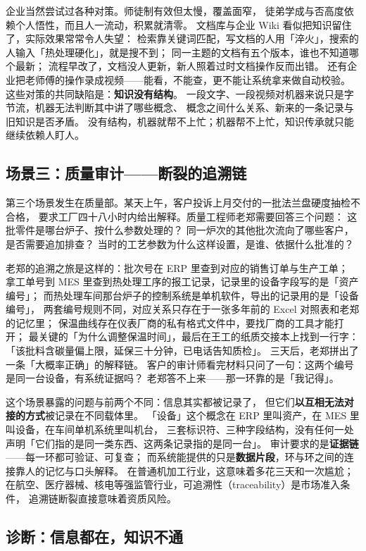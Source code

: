 企业当然尝试过各种对策。师徒制有效但太慢，覆盖面窄，
徒弟学成与否高度依赖个人悟性，而且人一流动，积累就清零。
文档库与企业 Wiki 看似把知识留住了，实际效果常常令人失望：
检索靠关键词匹配，写文档的人用「淬火」，搜索的人输入「热处理硬化」，就是搜不到；
同一主题的文档有五个版本，谁也不知道哪个最新；
流程早改了，文档没人更新，新人照着过时文档操作反而出错。
还有企业把老师傅的操作录成视频——能看，不能查，更不能让系统拿来做自动校验。
这些对策的共同缺陷是：\textbf{知识没有结构}。
一段文字、一段视频对机器来说只是字节流，机器无法判断其中讲了哪些概念、
概念之间什么关系、新来的一条记录与旧知识是否矛盾。
没有结构，机器就帮不上忙；机器帮不上忙，知识传承就只能继续依赖人盯人。

\subsection{场景三：质量审计——断裂的追溯链}

第三个场景发生在质量部。某天上午，客户投诉上月交付的一批法兰盘硬度抽检不合格，
要求工厂四十八小时内给出解释。质量工程师老郑需要回答三个问题：
这批零件是哪台炉子、按什么参数处理的？
同一炉次的其他批次流向了哪些客户，是否需要追加排查？
当时的工艺参数为什么这样设置，是谁、依据什么批准的？

老郑的追溯之旅是这样的：批次号在 ERP 里查到对应的销售订单与生产工单；
拿工单号到 MES 里查到热处理工序的报工记录，记录里的设备字段写的是「资产编号」；
而热处理车间那台炉子的控制系统是单机软件，导出的记录用的是「设备编号」，
两套编号规则不同，对应关系只存在于一张多年前的 Excel 对照表和老郑的记忆里；
保温曲线存在仪表厂商的私有格式文件中，要找厂商的工具才能打开；
最关键的「为什么调整保温时间」，最后在王工的纸质交接本上找到一行字：
「该批料含碳量偏上限，延保三十分钟，已电话告知质检」。
三天后，老郑拼出了一条「大概率正确」的解释链。
客户的审计师看完材料只问了一句：这两个编号是同一台设备，有系统证据吗？
老郑答不上来——那一环靠的是「我记得」。

这个场景暴露的问题与前两个不同：信息其实都被记录了，
但它们\textbf{以互相无法对接的方式}被记录在不同载体里。
「设备」这个概念在 ERP 里叫资产，在 MES 里叫设备，在车间单机系统里叫机台，
三套标识符、三种字段结构，没有任何一处声明「它们指的是同一类东西、这两条记录指的是同一台」。
审计要求的是\textbf{证据链}——每一环都可验证、可复查；
而系统能提供的只是\textbf{数据片段}，环与环之间的连接靠人的记忆与口头解释。
在普通机加工行业，这意味着多花三天和一次尴尬；
在航空、医疗器械、核电等强监管行业，可追溯性（traceability）是市场准入条件，
追溯链断裂直接意味着资质风险。

\subsection{诊断：信息都在，知识不通}

